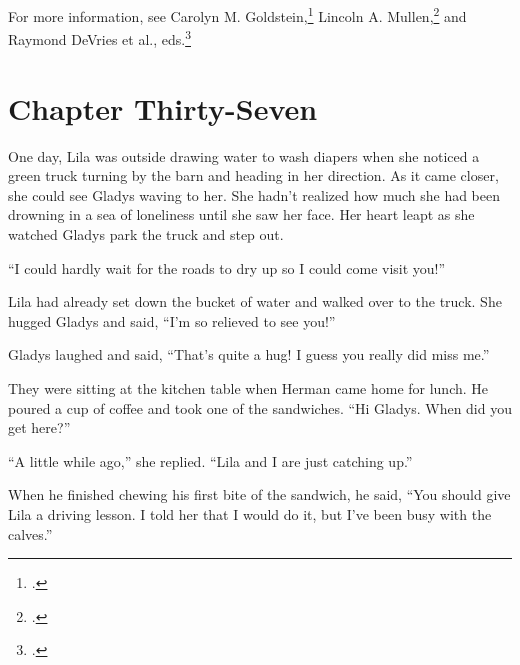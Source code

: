 \documentclass[
  american,
  letterpaper,
]{book}
\begin{document}
For more information, see Carolyn M. Goldstein,\footnote{.} Lincoln A.
Mullen,\footnote{.} and Raymond DeVries et al., eds.\footnote{.}


\chapter{Chapter Thirty-Seven}\label{chapter-thirty-seven}

One day, Lila was outside drawing water to wash diapers when she noticed
a green truck turning by the barn and heading in her direction. As it
came closer, she could see Gladys waving to her. She hadn't realized how
much she had been drowning in a sea of loneliness until she saw her
face. Her heart leapt as she watched Gladys park the truck and step out.

``I could hardly wait for the roads to dry up so I could come visit
you!''

Lila had already set down the bucket of water and walked over to the
truck. She hugged Gladys and said, ``I'm so relieved to see you!''

Gladys laughed and said, ``That's quite a hug! I guess you really did
miss me.''

They were sitting at the kitchen table when Herman came home for lunch.
He poured a cup of coffee and took one of the sandwiches. ``Hi Gladys.
When did you get here?''

``A little while ago,'' she replied. ``Lila and I are just catching
up.''

When he finished chewing his first bite of the sandwich, he said, ``You
should give Lila a driving lesson. I told her that I would do it, but
I've been busy with the calves.''
\end{document}
